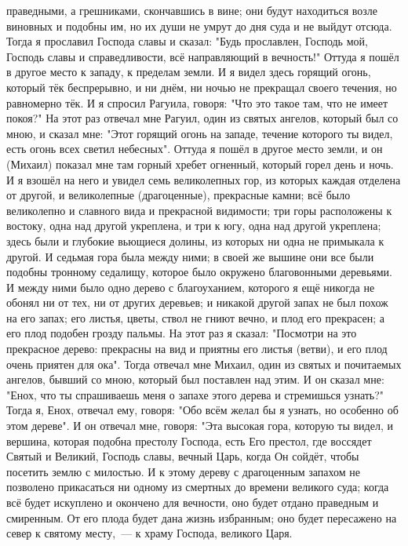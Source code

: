 праведными, а грешниками, скончавшись в вине; они будут находиться возле
виновных и подобны им, но их души не умрут до дня суда и не выйдут отсюда.
Тогда я прославил Господа славы и сказал: "Будь прославлен, Господь
мой, Господь славы и справедливости, всё направляющий в вечность!"
Оттуда я пошёл в другое место к западу, к пределам земли.
И я видел здесь горящий огонь, который тёк беспрерывно, и ни днём, ни
ночью не прекращал своего течения, но равномерно тёк.
И я спросил Рагуила, говоря: "Что это такое там, что не имеет покоя?"
На этот раз отвечал мне Рагуил, один из святых ангелов, который был
со мною, и сказал мне: "Этот горящий огонь на западе, течение которого ты
видел, есть огонь всех светил небесных".
Оттуда я пошёл в другое место земли, и он (Михаил) показал мне
там горный хребет огненный, который горел день и ночь.
И я взошёл на него и увидел семь великолепных гор, из которых каждая
отделена от другой, и великолепные (драгоценные), прекрасные камни; всё было
великолепно и славного вида и прекрасной видимости; три горы расположены к
востоку, одна над другой укреплена, и три к югу, одна над другой укреплена;
здесь были и глубокие вьющиеся долины, из которых ни одна не примыкала к
другой.
И седьмая гора была между ними; в своей же вышине они все были
подобны тронному седалищу, которое было окружено благовонными деревьями.
И  между ними было одно дерево с благоуханием, которого я ещё никогда
не обонял ни от тех, ни от других деревьев; и никакой другой запах не был похож
на его запах; его листья, цветы, ствол не гниют вечно, и плод его прекрасен; а
его плод подобен грозду пальмы.
На этот раз я сказал: "Посмотри на это прекрасное дерево: прекрасны
на вид и приятны его листья (ветви), и его плод очень приятен для ока".
Тогда отвечал мне Михаил, один из святых и почитаемых ангелов, бывший
со мною, который был поставлен над этим.
И он сказал мне: "Енох, что ты спрашиваешь меня о запахе этого
дерева и стремишься узнать?"
Тогда я, Енох, отвечал ему, говоря: "Обо всём желал бы я узнать, но
особенно об этом дереве".
И он отвечал мне, говоря: "Эта высокая гора, которую ты видел, и
вершина, которая подобна престолу Господа, есть Его престол, где воссядет
Святый и Великий, Господь славы, вечный Царь, когда Он сойдёт, чтобы посетить
землю с милостью.
И к этому дереву с драгоценным запахом не позволено прикасаться ни
одному из смертных до времени великого суда; когда всё будет искуплено и
окончено для вечности, оно будет отдано праведным и смиренным.
От его плода будет дана жизнь избранным; оно будет пересажено на
север к святому месту,~--- к храму Господа, великого Царя.

